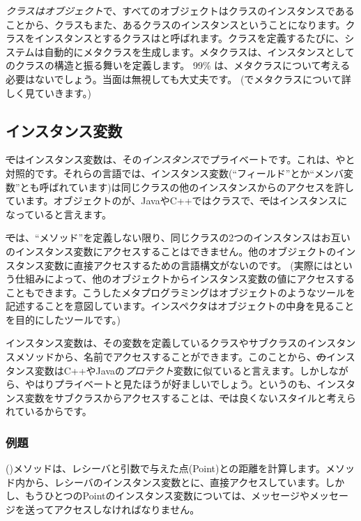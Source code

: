 \documentclass[a4paper,10pt,twoside]{book}
\begin{document}
\emph{クラスはオブジェクト}で、{すべてのオブジェクトはクラスのインスタンスである}ことから、クラスもまた、あるクラスのインスタンスということになります。クラスをインスタンスとするクラスはと呼ばれます。クラスを定義するたびに、システムは自動的にメタクラスを生成します。メタクラスは、インスタンスとしてのクラスの構造と振る舞いを定義します。
99\% は、メタクラスについて考える必要はないでしょう。当面は無視しても大丈夫です。
(でメタクラスについて詳しく見ていきます。)
\subsection{インスタンス変数}

\st ではインスタンス変数は、その\emph{インスタンス}でプライベートです。これは、やと対照的です。それらの言語では、インスタンス変数(``フィールド''とか``メンバ変数''とも呼ばれています)は同じクラスの他のインスタンスからのアクセスを許しています。オブジェクトのが、JavaやC++ではクラスで、\st ではインスタンスになっていると言えます。


\st では、``メソッド''を定義しない限り、同じクラスの2つのインスタンスはお互いのインスタンス変数にアクセスすることはできません。他のオブジェクトのインスタンス変数に直接アクセスするための言語構文がないのです。
(実際にはという仕組みによって、他のオブジェクトからインスタンス変数の値にアクセスすることもできます。こうしたメタプログラミングはオブジェクトのようなツールを記述することを意図しています。インスペクタはオブジェクトの中身を見ることを目的にしたツールです。)

インスタンス変数は、その変数を定義しているクラスやサブクラスのインスタンスメソッドから、名前でアクセスすることができます。このことから、\st のインスタンス変数はC++やJavaの\emph{プロテクト}変数に似ていると言えます。しかしながら、やはりプライベートと見たほうが好ましいでしょう。というのも、インスタンス変数をサブクラスからアクセスすることは、\st では良くないスタイルと考えられているからです。

\subsubsection{例題}
 ()メソッドは、レシーバと引数で与えた点(Point)との距離を計算します。メソッド内から、レシーバのインスタンス変数とに、直接アクセスしています。しかし、もうひとつのPointのインスタンス変数については、メッセージやメッセージを送ってアクセスしなければなりません。
\end{document}

